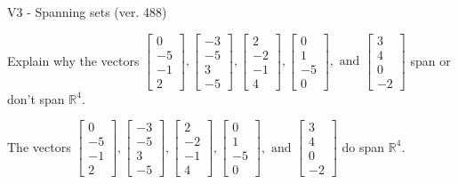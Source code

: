 \begin{exercise}
  \begin{exerciseTitle}V3 - Spanning sets (ver. 488)\end{exerciseTitle}
  \begin{exerciseStatement}
    Explain why the vectors \(\left[\begin{array}{r}
0 \\
-5 \\
-1 \\
2
\end{array}\right] , \left[\begin{array}{r}
-3 \\
-5 \\
3 \\
-5
\end{array}\right] , \left[\begin{array}{r}
2 \\
-2 \\
-1 \\
4
\end{array}\right] , \left[\begin{array}{r}
0 \\
1 \\
-5 \\
0
\end{array}\right] , \text{ and } \left[\begin{array}{r}
3 \\
4 \\
0 \\
-2
\end{array}\right]\) span or don't span \(\mathbb{R}^4\). 
	


  \end{exerciseStatement}
  \begin{exerciseAnswer}
   The vectors \(\left[\begin{array}{r}
0 \\
-5 \\
-1 \\
2
\end{array}\right] , \left[\begin{array}{r}
-3 \\
-5 \\
3 \\
-5
\end{array}\right] , \left[\begin{array}{r}
2 \\
-2 \\
-1 \\
4
\end{array}\right] , \left[\begin{array}{r}
0 \\
1 \\
-5 \\
0
\end{array}\right] , \text{ and } \left[\begin{array}{r}
3 \\
4 \\
0 \\
-2
\end{array}\right]\) 
  	 do  
	span \(\mathbb{R}^4\).
  



\end{exerciseAnswer}
\end{exercise}
